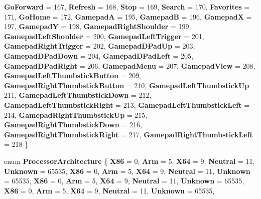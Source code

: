 \begin{DoxyCompactItemize}
\newline
{\bfseries Go\+Forward} = 167, 
{\bfseries Refresh} = 168, 
{\bfseries Stop} = 169, 
{\bfseries Search} = 170, 
\newline
{\bfseries Favorites} = 171, 
{\bfseries Go\+Home} = 172, 
{\bfseries GamepadA} = 195, 
{\bfseries GamepadB} = 196, 
\newline
{\bfseries GamepadX} = 197, 
{\bfseries GamepadY} = 198, 
{\bfseries Gamepad\+Right\+Shoulder} = 199, 
{\bfseries Gamepad\+Left\+Shoulder} = 200, 
\newline
{\bfseries Gamepad\+Left\+Trigger} = 201, 
{\bfseries Gamepad\+Right\+Trigger} = 202, 
{\bfseries Gamepad\+D\+Pad\+Up} = 203, 
{\bfseries Gamepad\+D\+Pad\+Down} = 204, 
\newline
{\bfseries Gamepad\+D\+Pad\+Left} = 205, 
{\bfseries Gamepad\+D\+Pad\+Right} = 206, 
{\bfseries Gamepad\+Menu} = 207, 
{\bfseries Gamepad\+View} = 208, 
\newline
{\bfseries Gamepad\+Left\+Thumbstick\+Button} = 209, 
{\bfseries Gamepad\+Right\+Thumbstick\+Button} = 210, 
{\bfseries Gamepad\+Left\+Thumbstick\+Up} = 211, 
{\bfseries Gamepad\+Left\+Thumbstick\+Down} = 212, 
\newline
{\bfseries Gamepad\+Left\+Thumbstick\+Right} = 213, 
{\bfseries Gamepad\+Left\+Thumbstick\+Left} = 214, 
{\bfseries Gamepad\+Right\+Thumbstick\+Up} = 215, 
{\bfseries Gamepad\+Right\+Thumbstick\+Down} = 216, 
\newline
{\bfseries Gamepad\+Right\+Thumbstick\+Right} = 217, 
{\bfseries Gamepad\+Right\+Thumbstick\+Left} = 218
 \}
\item 
\mbox{\label{namespace_windows_1_1_system_a9ba7fe5d0a9bba15cd53379017c5f593}} 
enum {\bfseries Processor\+Architecture} \{ \newline
{\bfseries X86} = 0, 
{\bfseries Arm} = 5, 
{\bfseries X64} = 9, 
{\bfseries Neutral} = 11, 
\newline
{\bfseries Unknown} = 65535, 
{\bfseries X86} = 0, 
{\bfseries Arm} = 5, 
{\bfseries X64} = 9, 
\newline
{\bfseries Neutral} = 11, 
{\bfseries Unknown} = 65535, 
{\bfseries X86} = 0, 
{\bfseries Arm} = 5, 
\newline
{\bfseries X64} = 9, 
{\bfseries Neutral} = 11, 
{\bfseries Unknown} = 65535, 
{\bfseries X86} = 0, 
\newline
{\bfseries Arm} = 5, 
{\bfseries X64} = 9, 
{\bfseries Neutral} = 11, 
{\bfseries Unknown} = 65535, 

\end{DoxyCompactItemize}
